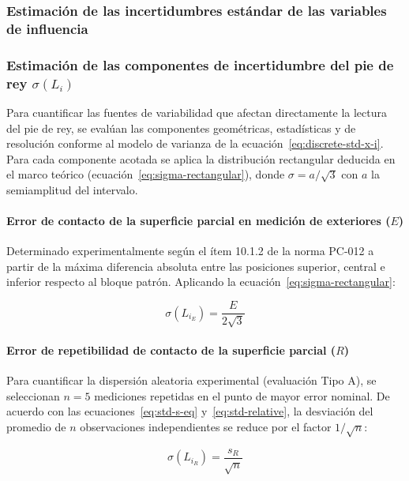 \subsubsection*{Estimación de las incertidumbres estándar de las variables de influencia}

\subsubsection{Estimación de las componentes de incertidumbre del pie de rey \texorpdfstring{$\sigma(L_i)$}{\sigma(L_i)}}

Para cuantificar las fuentes de variabilidad que afectan directamente la lectura del pie de rey, se evalúan las componentes geométricas, estadísticas y de resolución conforme al modelo de varianza de la ecuación~\eqref{eq:discrete-std-x-i}. Para cada componente acotada se aplica la distribución rectangular deducida en el marco teórico (ecuación~\eqref{eq:sigma-rectangular}), donde $\sigma = a/\sqrt{3}$ con $a$ la semiamplitud del intervalo.

\paragraph{Error de contacto de la superficie parcial en medición de exteriores ($E$)}
Determinado experimentalmente según el ítem 10.1.2 de la norma PC-012 a partir de la máxima diferencia absoluta entre las posiciones superior, central e inferior respecto al bloque patrón. Aplicando la ecuación~\eqref{eq:sigma-rectangular}:

\begin{equation}
    \sigma(L_{i_E}) = \frac{E}{2\sqrt{3}}
    \label{eq:sigma-LiE}
\end{equation}

\paragraph{Error de repetibilidad de contacto de la superficie parcial ($R$)}
Para cuantificar la dispersión aleatoria experimental (evaluación Tipo A), se seleccionan $n = 5$ mediciones repetidas en el punto de mayor error nominal. De acuerdo con las ecuaciones~\eqref{eq:std-s-eq} y~\eqref{eq:std-relative}, la desviación del promedio de $n$ observaciones independientes se reduce por el factor $1/\sqrt{n}$:

\begin{equation}
    \sigma(L_{i_R}) = \frac{s_R}{\sqrt{n}}
    \label{eq:sigma-LiR}
\end{equation}

